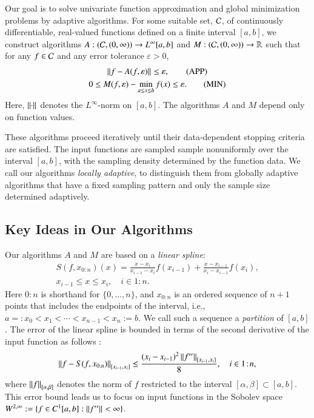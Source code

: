 \documentclass[review]{elsarticle}
\newcommand{\abstol}{\varepsilon}
\newcommand{\oton}{1\!:\!n}
\newcommand{\datasites}{x_{0:n}}
\theoremstyle{definition}
\renewcommand{\cw}{W}
\begin{document}
Our goal is to solve univariate function approximation and global minimization
problems by adaptive algorithms. For some suitable set, $\cc$, of continuously
differentiable, real-valued functions defined on a finite interval $[a,b]$, we
construct algorithms $A:(\cc,(0,\infty)) \to L^{\infty}[a,b]$ and $M:
(\cc,(0,\infty)) \to \reals$ such that for any $f \in \cc$ and any error
tolerance $\abstol > 0$, \begin{gather} \norm{f - A(f,\abstol)} \le \abstol,
\tag{APP} \label{appxprob} \\ 0 \le M(f,\abstol) - \min_{a \le x \le b} f(x) \le
\abstol. \tag{MIN} \label{optprob} \end{gather} Here, $\norm{\cdot}$ denotes the
$L^{\infty}$-norm on $[a,b]$. The algorithms $A$ and $M$ depend only on function
values.

These algorithms proceed iteratively until their data-dependent stopping
criteria are satisfied. The input functions are sampled sample nonuniformly over
the interval $[a,b]$, with the sampling density determined by the function data.
We call our algorithms \emph{locally adaptive}, to distinguish them from
globally adaptive algorithms that have a fixed sampling pattern and only the
sample size determined adaptively.

\subsection{Key Ideas in Our Algorithms} \label{subsec:keyideas}

Our algorithms $A$ and $M$ are based on a \emph{linear spline}: 
\begin{multline} \label{splinedef}
   S(f,\datasites)(x) =  
   \frac{x-x_i}{x_{i-1} - x_i} f(x_{i-1}) + \frac{x-x_{i-1}}{x_{i} - x_{i-1}}f(x_i), 
\\ x_{i-1} \le x \le x_i, \quad i \in \oton.
\end{multline}
Here ${0\!:\!n}$ is shorthand for $\{0, \ldots, n\}$, and $\datasites$ is an
ordered sequence of $n+1$ points that includes the endpoints of the interval,
i.e., $a=:x_0 <x_1 < \cdots < x_{n-1} < x_{n}:=b$. We call such a sequence a
\emph{partition} of $[a,b]$. The error of the linear spline is bounded in terms
of the second derivative of the input function as follows \cite[Theorem
3.3]{BurFaiBur16a}:
\begin{equation} \label{appxerrbda}
	\norm[{[x_{i-1},x_i]}]{f - S(f,\datasites)} 
	\le \frac{(x_i - x_{i-1})^2\norm[{[x_{i-1},x_i]}]{f''}}{8}, \quad i \in \oton,
\end{equation}
where $\norm[{[\alpha,\beta]}]{f}$ denotes the norm of $f$ restricted to the
interval $[\alpha,\beta] \subset [a,b]$. This error bound leads us to focus on
input functions in the Sobolev space $\cw^{2,\infty} := \{f \in C^1[a,b] :
\norm{f''} < \infty \}$.
\end{document}
